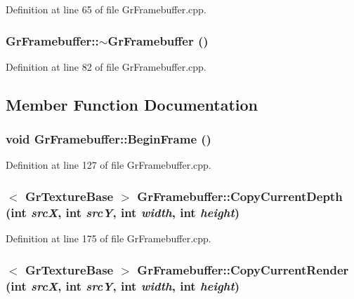 Definition at line 65 of file GrFramebuffer.cpp.\hypertarget{class_gr_framebuffer_e94e0323428385049cc79200fb15a6b0}{
\subsubsection[{$\sim$GrFramebuffer}]{\setlength{\rightskip}{0pt plus 5cm}GrFramebuffer::$\sim$GrFramebuffer ()}}
\label{class_gr_framebuffer_e94e0323428385049cc79200fb15a6b0}




Definition at line 82 of file GrFramebuffer.cpp.

\subsection{Member Function Documentation}
\hypertarget{class_gr_framebuffer_b5ef7902c9a6db344d3be04c5747a007}{
\subsubsection[{BeginFrame}]{\setlength{\rightskip}{0pt plus 5cm}void GrFramebuffer::BeginFrame ()}}
\label{class_gr_framebuffer_b5ef7902c9a6db344d3be04c5747a007}




Definition at line 127 of file GrFramebuffer.cpp.\hypertarget{class_gr_framebuffer_ba49556b67bae1454a162bc6c1df7bd3}{
\subsubsection[{CopyCurrentDepth}]{$<$ {\bf GrTextureBase} $>$ GrFramebuffer::CopyCurrentDepth (int {\em srcX}, \/  int {\em srcY}, \/  int {\em width}, \/  int {\em height})}}
\label{class_gr_framebuffer_ba49556b67bae1454a162bc6c1df7bd3}




Definition at line 175 of file GrFramebuffer.cpp.\hypertarget{class_gr_framebuffer_c262b0f70df5aa7c47313b46894ffa7e}{
\subsubsection[{CopyCurrentRender}]{$<$ {\bf GrTextureBase} $>$ GrFramebuffer::CopyCurrentRender (int {\em srcX}, \/  int {\em srcY}, \/  int {\em width}, \/  int {\em height})}}
\label{class_gr_framebuffer_c262b0f70df5aa7c47313b46894ffa7e}




